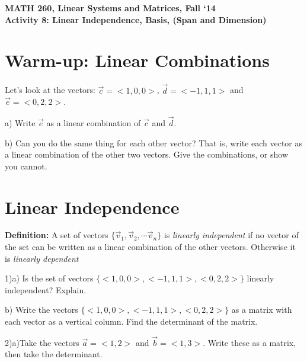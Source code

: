 \documentclass{article}
\begin{document}
\begin{flushleft}
	\bfseries{MATH 260, Linear Systems and Matrices, Fall `14}\\
	\bfseries{Activity 8:  Linear Independence, Basis, (Span and Dimension)}\\
\end{flushleft}
\begin{flushleft}

\section*{Warm-up:  Linear Combinations}

Let's look at the vectors: $\vec{c}=<1,0,0>$, $\vec{d}=<-1,1,1>$ and $\vec{e}=<0,2,2>$. 

\vspace{0.1in}

a) Write $\vec{e}$ as a linear combination of $\vec{c}$ and $\vec{d}$.

\vspace{1.5in}

b) Can you do the same thing for each other vector? That is, write each vector as a linear combination of the other two vectors. Give the combinations, or show you cannot.

\newpage
\section*{Linear Independence}
 \textbf{Definition:} A set of vectors $ \{ \vec{v}_1 , \vec{v}_2, \cdots \vec{v}_n \}$ is \textit{linearly independent} if no vector of the set can be written as a linear combination of the other vectors. Otherwise it is \textit{linearly dependent}

\vspace{0.1in}

1)a) Is the set of vectors $\{ <1,0,0>, <-1,1,1>, <0,2,2> \}$ linearly independent? Explain.

\vspace{1.5in}

b) Write the vectors $\{ <1,0,0>, <-1,1,1>, <0,2,2> \}$ as a matrix with each vector as a vertical column. Find the determinant of the matrix.

\vspace{1.5in}

2)a)Take the vectors $\vec{a}=<1,2>$ and $\vec{b}=<1,3>$. Write these as a matrix, then take the determinant.


\end{flushleft}
\end{document}
